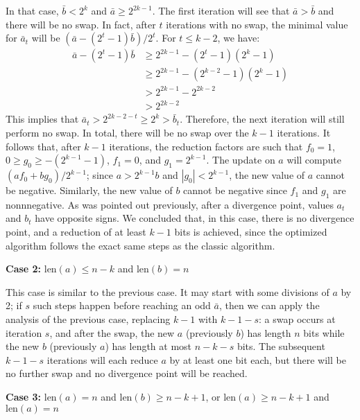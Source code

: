 \documentclass{llncs}
\newcommand{\bitlength}{\text{len}}
\begin{document}
In that case, $\bar b < 2^k$ and $\bar a \geq 2^{2k - 1}$. The first
iteration will see that $\bar a > \bar b$ and there will be no
swap. In fact, after $t$ iterations with no swap, the minimal value
for $\bar a_t$ will be $(\bar a - (2^t-1)\bar b)/2^t$. For
$t \leq k-2$, we have:
\begin{align*}
    \bar a - (2^t - 1)\bar b &\geq 2^{2k-1} - (2^t - 1)(2^k - 1) \\
        &\geq 2^{2k-1} - (2^{k-2} - 1)(2^k - 1) \\
        &>    2^{2k-1} - 2^{2k-2} \\
        &>    2^{2k-2}
\end{align*}
This implies that $\bar a_t > 2^{2k-2-t} \geq 2^{k} > \bar b_t$.
Therefore, the next iteration will still perform no swap. In total,
there will be no swap over the $k-1$ iterations. It follows that, after
$k-1$ iterations, the reduction factors are such that $f_0 = 1$, $0\geq
g_0\geq -(2^{k-1}-1)$, $f_1 = 0$, and $g_1 = 2^{k-1}$. The update on $a$
will compute $(af_0 + bg_0)/2^{k-1}$; since $a > 2^{k-1} b$ and $|g_0| <
2^{k-1}$, the new value of $a$ cannot be negative. Similarly, the new
value of $b$ cannot be negative since $f_1$ and $g_1$ are nonnnegative.
As was pointed out previously, after a divergence point, values $a_t$
and $b_t$ have opposite signs. We concluded that, in this case, there is
no divergence point, and a reduction of at least $k-1$ bits is achieved,
since the optimized algorithm follows the exact same steps as the
classic algorithm.

\vspace{2ex}
\noindent\textsf{\textbf{Case 2:}} $\bitlength(a) \leq n-k$ and
$\bitlength(b) = n$

This case is similar to the previous case. It may start with some
divisions of $a$ by 2; if $s$ such steps happen before reaching an odd
$\bar a$, then we can apply the analysis of the previous case, replacing
$k-1$ with $k-1-s$: a swap occurs at iteration $s$, and after the swap,
the new $a$ (previously $b$) has length $n$ bits while the new $b$
(previously $a$) has length at most $n-k-s$ bits. The subsequent
$k-1-s$ iterations will each reduce $a$ by at least one bit each, but
there will be no further swap and no divergence point will be reached.

\vspace{2ex}
\noindent\textsf{\textbf{Case 3:}} $\bitlength(a) = n$ and
$\bitlength(b) \geq n - k + 1$, or $\bitlength(a) \geq n - k + 1$
and $\bitlength(a) = n$
\end{document}
